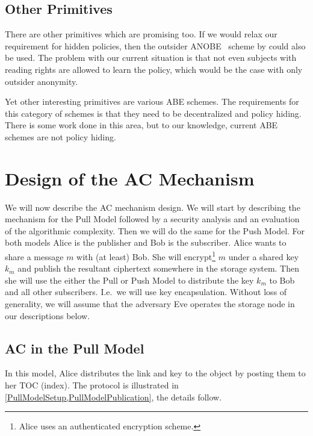 \subsection{Other Primitives}

There are other primitives which are promising too.
If we would relax our requirement for hidden policies, then the outsider 
\ac{ANOBE}~\cite{oANOBE} scheme by \citeauthor{oANOBE} could also be used.
The problem with our current situation is that not even subjects with reading 
rights are allowed to learn the policy, which would be the case with only 
outsider anonymity.

Yet other interesting primitives are various \ac{ABE} schemes.
The requirements for this category of schemes is that they need to be 
decentralized and policy hiding.
There is some work done in this area, but to our knowledge, current \ac{ABE} 
schemes are not policy hiding.


\section[Scheme Design]{Design of the \acl*{AC} Mechanism}\label{Design}

We will now describe the \ac{AC} mechanism design.
We will start by describing the mechanism for the Pull Model followed by 
a security analysis and an evaluation of the algorithmic complexity.
Then we will do the same for the Push Model.
For both models Alice is the publisher and Bob is the subscriber.
Alice wants to share a message \(m\) with (at least) Bob.
She will encrypt\footnote{%
  Alice uses an authenticated encryption scheme.
} \(m\) under a shared key \(k_m\) and publish the resultant ciphertext 
somewhere in the storage system.
Then she will use the either the Pull or Push Model to distribute the key 
\(k_m\) to Bob and all other subscribers.
I.e.\ we will use key encapsulation.
Without loss of generality, we will assume that the adversary Eve operates the 
storage node in our descriptions below.

\subsection{\Acl*{AC} in the Pull Model}\label{PullModelAC}

In this model, Alice distributes the link and key to the object by posting them 
to her \ac{TOC} (index).
The protocol is illustrated in \cref{PullModelSetup,PullModelPublication}, the 
details follow.


